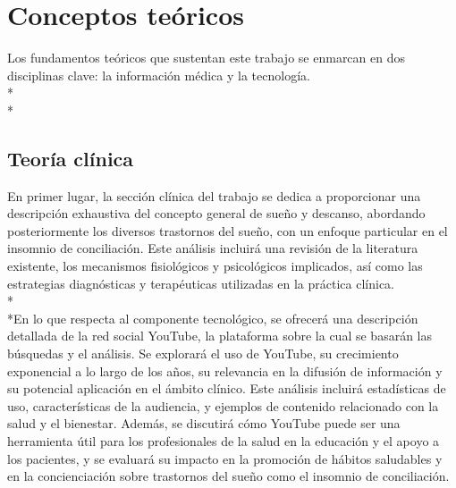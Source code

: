 \documentclass[a4paper,12pt,twoside]{memoir}
\begin{document}
\chapter{Conceptos teóricos}
    \text Los fundamentos teóricos que sustentan este trabajo se enmarcan en dos disciplinas clave: la información médica y la tecnología.  \\*\\*
    \section{Teoría clínica} En primer lugar, la sección clínica del trabajo se dedica a proporcionar una descripción exhaustiva del concepto general de sueño y descanso, abordando posteriormente los diversos trastornos del sueño, con un enfoque particular en el insomnio de conciliación. Este análisis incluirá una revisión de la literatura existente, los mecanismos fisiológicos y psicológicos implicados, así como las estrategias diagnósticas y terapéuticas utilizadas en la práctica clínica. \\*\\*En lo que respecta al componente tecnológico, se ofrecerá una descripción detallada de la red social YouTube, la plataforma sobre la cual se basarán las búsquedas y el análisis. Se explorará el uso de YouTube, su crecimiento exponencial a lo largo de los años, su relevancia en la difusión de información y su potencial aplicación en el ámbito clínico. Este análisis incluirá estadísticas de uso, características de la audiencia, y ejemplos de contenido relacionado con la salud y el bienestar. Además, se discutirá cómo YouTube puede ser una herramienta útil para los profesionales de la salud en la educación y el apoyo a los pacientes, y se evaluará su impacto en la promoción de hábitos saludables y en la concienciación sobre trastornos del sueño como el insomnio de conciliación.
\end{document}
